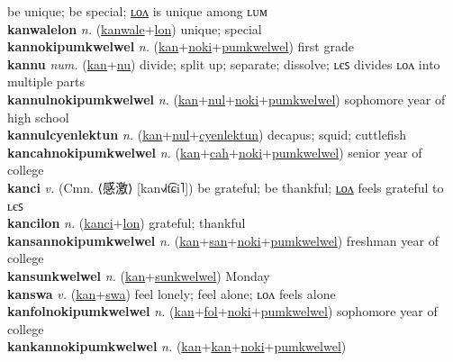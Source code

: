 be unique; be special; \hyperref[kanwalelon]{ʟᴏᴧ} is unique among ʟᴜᴍ \label{kanwale} \\
\textbf{kanwalelon} \textit{n.} (\hyperref[kanwale]{kanwale}+\hyperref[lon]{lon})
unique; special \label{kanwalelon} \\
\textbf{kannokipumkwelwel} \textit{n.} (\hyperref[kan]{kan}+\hyperref[noki]{noki}+\hyperref[pumkwelwel]{pumkwelwel})
first grade \label{kannokipumkwelwel} \\
\textbf{kannu} \textit{num.} (\hyperref[kan]{kan}+\hyperref[nu]{nu})
divide; split up; separate; dissolve; ʟєꜱ divides ʟᴏᴧ into multiple parts \label{kannu} \\
\textbf{kannulnokipumkwelwel} \textit{n.} (\hyperref[kan]{kan}+\hyperref[nul]{nul}+\hyperref[noki]{noki}+\hyperref[pumkwelwel]{pumkwelwel})
sophomore year of high school \label{kannulnokipumkwelwel} \\
\textbf{kannulcyenlektun} \textit{n.} (\hyperref[kan]{kan}+\hyperref[nul]{nul}+\hyperref[cyenlektun]{cyenlektun})
decapus; squid; cuttlefish \label{kannulcyenlektun} \\
\textbf{kancahnokipumkwelwel} \textit{n.} (\hyperref[kan]{kan}+\hyperref[cah]{cah}+\hyperref[noki]{noki}+\hyperref[pumkwelwel]{pumkwelwel})
senior year of college \label{kancahnokipumkwelwel} \\
\textbf{kanci} \textit{v.} (Cmn. ⟨感激⟩ [kan˧˩˧t͡ɕi˥])
be grateful; be thankful; \hyperref[kancilon]{ʟᴏᴧ} feels grateful to ʟєꜱ \label{kanci} \\
\textbf{kancilon} \textit{n.} (\hyperref[kanci]{kanci}+\hyperref[lon]{lon})
grateful; thankful \label{kancilon} \\
\textbf{kansannokipumkwelwel} \textit{n.} (\hyperref[kan]{kan}+\hyperref[san]{san}+\hyperref[noki]{noki}+\hyperref[pumkwelwel]{pumkwelwel})
freshman year of college \label{kansannokipumkwelwel} \\
\textbf{kansunkwelwel} \textit{n.} (\hyperref[kan]{kan}+\hyperref[sunkwelwel]{sunkwelwel})
Monday \label{kansunkwelwel} \\
\textbf{kanswa} \textit{v.} (\hyperref[kan]{kan}+\hyperref[swa]{swa})
feel lonely; feel alone; ʟᴏᴧ feels alone \label{kanswa} \\
\textbf{kanfolnokipumkwelwel} \textit{n.} (\hyperref[kan]{kan}+\hyperref[fol]{fol}+\hyperref[noki]{noki}+\hyperref[pumkwelwel]{pumkwelwel})
sophomore year of college \label{kanfolnokipumkwelwel} \\
\textbf{kankannokipumkwelwel} \textit{n.} (\hyperref[kan]{kan}+\hyperref[kan]{kan}+\hyperref[noki]{noki}+\hyperref[pumkwelwel]{pumkwelwel})
